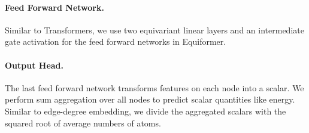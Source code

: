 \vspace{-2.25mm}
\paragraph{Feed Forward Network.}
Similar to Transformers, we use two equivariant linear layers and an intermediate gate activation for the feed forward networks in Equiformer.


\vspace{-2.25mm}
\paragraph{Output Head.}
The last feed forward network transforms features on each node into a scalar.
We perform sum aggregation over all nodes to predict scalar quantities like energy.
Similar to edge-degree embedding, we divide the aggregated scalars with the squared root of average numbers of atoms.


